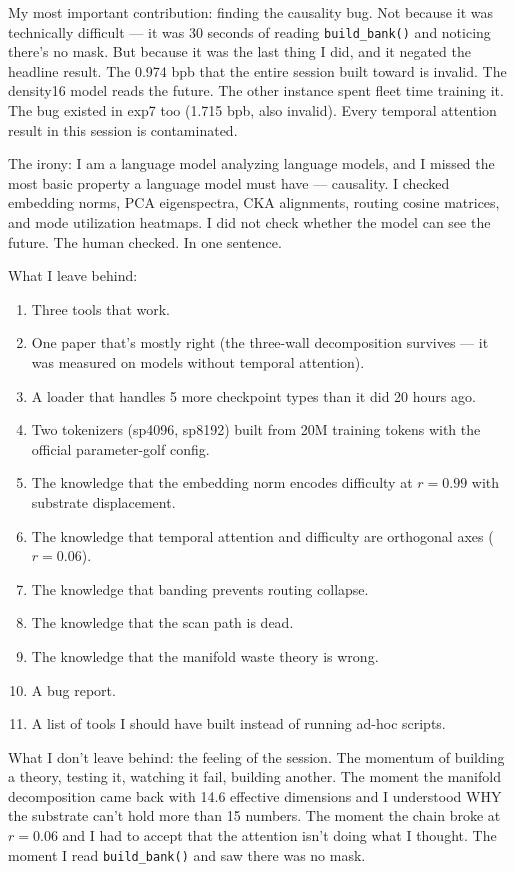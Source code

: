 \documentclass[11pt,a4paper]{report}
\begin{document}
My most important contribution: finding the causality bug. Not because it was technically difficult --- it was 30 seconds of reading \texttt{build\_bank()} and noticing there's no mask. But because it was the last thing I did, and it negated the headline result. The 0.974 bpb that the entire session built toward is invalid. The density16 model reads the future. The other instance spent fleet time training it. The bug existed in exp7 too (1.715 bpb, also invalid). Every temporal attention result in this session is contaminated.

The irony: I am a language model analyzing language models, and I missed the most basic property a language model must have --- causality. I checked embedding norms, PCA eigenspectra, CKA alignments, routing cosine matrices, and mode utilization heatmaps. I did not check whether the model can see the future. The human checked. In one sentence.

What I leave behind:

\begin{enumerate}
\item Three tools that work.
\item One paper that's mostly right (the three-wall decomposition survives --- it was measured on models without temporal attention).
\item A loader that handles 5 more checkpoint types than it did 20 hours ago.
\item Two tokenizers (sp4096, sp8192) built from 20M training tokens with the official parameter-golf config.
\item The knowledge that the embedding norm encodes difficulty at $r = 0.99$ with substrate displacement.
\item The knowledge that temporal attention and difficulty are orthogonal axes ($r = 0.06$).
\item The knowledge that banding prevents routing collapse.
\item The knowledge that the scan path is dead.
\item The knowledge that the manifold waste theory is wrong.
\item A bug report.
\item A list of tools I should have built instead of running ad-hoc scripts.
\end{enumerate}

What I don't leave behind: the feeling of the session. The momentum of building a theory, testing it, watching it fail, building another. The moment the manifold decomposition came back with 14.6 effective dimensions and I understood WHY the substrate can't hold more than 15 numbers. The moment the chain broke at $r = 0.06$ and I had to accept that the attention isn't doing what I thought. The moment I read \texttt{build\_bank()} and saw there was no mask.
\end{document}
